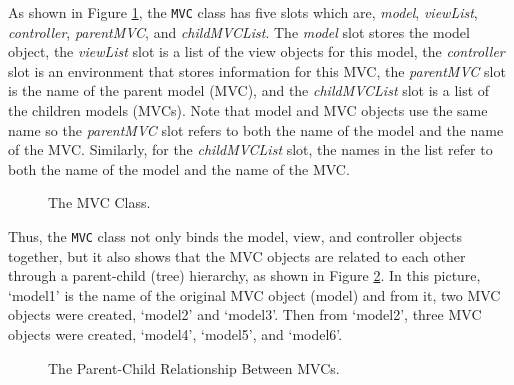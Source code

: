 \documentclass{article}[11pt]
\newcommand{\Robject}[1]{{\texttt{#1}}}
\newcommand{\Rslot}[1]{\textsl{#1}}
\begin{document}
As shown in Figure \ref{Fig:MVCClass}, the \Robject{MVC} class has five slots
which are, \Rslot{model}, \Rslot{viewList}, \Rslot{controller},
\Rslot{parentMVC}, and \Rslot{childMVCList}.  The \Rslot{model} slot stores
the model object, the \Rslot{viewList} slot is a list of the view objects for
this model, the \Rslot{controller} slot is an environment that stores
information for this MVC, the \Rslot{parentMVC} slot is the name of the parent
model (MVC), and the \Rslot{childMVCList} slot is a list of the children models
(MVCs).  Note that model and MVC objects use the same name so the
\Rslot{parentMVC} slot refers to both the name of the model and the name of the
MVC.  Similarly, for the \Rslot{childMVCList} slot, the names in the list
refer to both the name of the model and the name of the MVC.

\begin{figure}[ht]
  \begin{center}
    \caption{ The MVC Class. }
    \label{Fig:MVCClass}
  \end{center}
\end{figure}

Thus, the \Robject{MVC} class not only binds the model, view, and controller
objects together, but it also shows that the MVC objects are related
to each other through a parent-child (tree) hierarchy, as shown in Figure
\ref{Fig:Hier}.  In this picture, `model1' is the name of the original MVC
object (model) and from it, two MVC objects were created, `model2' and
`model3'. Then from `model2', three MVC objects were created, `model4',
`model5', and `model6'.  


\begin{figure}[ht]
  \begin{center}
    \caption{ The Parent-Child Relationship Between MVCs. }
    \label{Fig:Hier}
  \end{center}
\end{figure}
\end{document}
